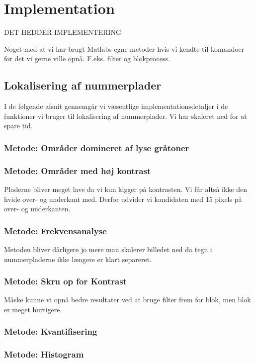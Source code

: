 \section{Implementation}
DET HEDDER IMPLEMENTERING

\label{sec_implementation}
Noget med at vi har brugt Matlabs egne metoder hvis vi kendte til komandoer for det vi gerne ville opnå. F.eks. filter og blokprocess.

\subsection{Lokalisering af nummerplader}
I de følgende afsnit gennemgår vi væsentlige implementationsdetaljer i de funktioner vi bruger til lokalisering af nummerplader. Vi har skaleret ned for at spare tid.

\subsubsection{Metode: Områder domineret af lyse gråtoner}

\subsubsection{Metode: Områder med høj kontrast}
Pladerne bliver meget lave da vi kun kigger på kontrasten. Vi får altså ikke den hvide over- og underkant med. Derfor udvider vi kandidaten med 15 pixels på over- og underkanten. 

\subsubsection{Metode: Frekvensanalyse}
Metoden bliver dårligere jo mere man skalerer billedet ned da tegn i nummerpladerne ikke længere er klart separeret.

\subsubsection{Metode: Skru op for Kontrast}
Måske kunne vi opnå bedre resultater ved at bruge filter frem for blok, men blok er meget hurtigere.

\subsubsection{Metode: Kvantifisering}


\subsubsection{Metode: Histogram}




